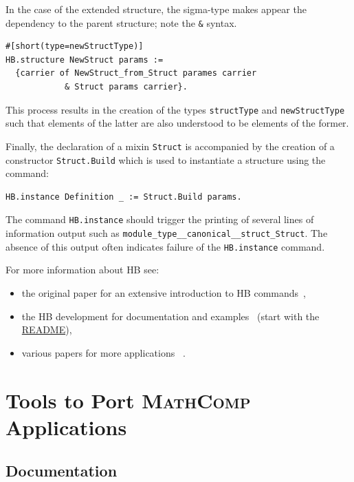\documentclass{article}
\def\mathcomp{\textsc{MathComp}}
\def\hb{\textsc{HB}}
\def\coqin#1{\texttt{#1}}
\begin{document}
In the case of the extended structure, the sigma-type makes appear the
dependency to the parent structure; note the \coqin{&} syntax.
\begin{verbatim}
#[short(type=newStructType)]
HB.structure NewStruct params :=
  {carrier of NewStruct_from_Struct parames carrier
            & Struct params carrier}.
\end{verbatim}

This process results in the creation of the types \coqin{structType}
and \coqin{newStructType} such that elements of the latter are also
understood to be elements of the former.

Finally, the declaration of a mixin \coqin{Struct} is accompanied by
the creation of a constructor \coqin{Struct.Build} which is used to instantiate
a structure using the command:
\begin{verbatim}
HB.instance Definition _ := Struct.Build params.
\end{verbatim}
The command \coqin{HB.instance} should trigger the printing of several
lines of information output such as
\coqin{module_type__canonical__struct_Struct}.  The absence of this
output often indicates failure of the \coqin{HB.instance} command.

For more information about \hb{} see:
\begin{itemize}
\item the original paper for an extensive introduction to \hb{} commands~\cite{cohen2020fscd},
\item the \hb{} development for documentation and examples~\cite{hb}
(start with the \href{https://github.com/math-comp/hierarchy-builder#readme}{README}),
\item various papers for more applications~\cite{mathcomp2021coq} \cite[Sect.~3]{affeldt2022arxiv} \cite[Sect.~4]{affeldt2023cpp}.
\end{itemize}

\section{Tools to Port \mathcomp{} Applications}
\label{sec:explore}

\subsection{Documentation}
\end{document}
